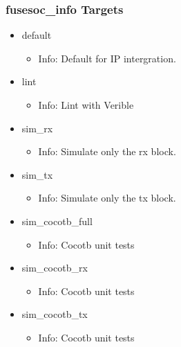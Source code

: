 \subsubsection{fusesoc\_info Targets}
\begin{itemize}
\item default
	\begin{itemize}
	\item[$\space$] Info: Default for IP intergration.
	\end{itemize}
\item lint
	\begin{itemize}
	\item[$\space$] Info: Lint with Verible
	\end{itemize}
\item sim\_rx
	\begin{itemize}
	\item[$\space$] Info: Simulate only the rx block.
	\end{itemize}
\item sim\_tx
	\begin{itemize}
	\item[$\space$] Info: Simulate only the tx block.
	\end{itemize}
\item sim\_cocotb\_full
	\begin{itemize}
	\item[$\space$] Info: Cocotb unit tests
	\end{itemize}
\item sim\_cocotb\_rx
	\begin{itemize}
	\item[$\space$] Info: Cocotb unit tests
	\end{itemize}
\item sim\_cocotb\_tx
	\begin{itemize}
	\item[$\space$] Info: Cocotb unit tests
	\end{itemize}
\end{itemize}
